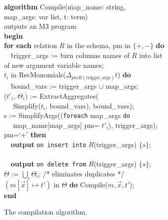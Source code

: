 \begin{figure}
\begin{tabbing}
{\bf algorithm} Compile(\=map\_name: string, \\
                  \>map\_args: var list,
                    t: term) \\
outputs an M3 program \\
{\bf begin} \\
{\bf for each} relation $R$ in the schema,
               pm in $\{+,-\}$ {\bf do} \\
~~\=
  trigger\_args := \=turn columns names of $R$ into list \\
\>               \>of new argument variable names; \\[1ex]
 $t_i$ in
        RecMonomials($\Delta_{pm R(\mathrm{trigger\_args})} t$) {\bf do} \\[1ex]
\>~~\=bound\_vars := trigger\_args $\cup$ map\_args; \\[1ex]
\>\>($t'_i$, $\Theta_i$) := ExtractAggregates( \\
\>\>~~      Simplify($t_i$, bound\_vars), bound\_vars); \\[1ex]
\>\>s := SimplifyArgs\big(({\tt foreach} map\_args {\tt do} \\
\>\>~~       map\_name[map\_args] pm= $t'_i$), trigger\_args\big); \\[1ex]
\> pm=`+' {\bf then} \\
\>\>~~{\bf output} {\tt on insert into} $R$(trigger\_args) $\{s\}$; \\
\> \\
\>\>~~{\bf output} {\tt on delete from} $R$(trigger\_args) $\{s\}$; \\[1ex]
\>$\Theta$ := $\bigcup_i \Theta_i$; /* eliminates duplicates */ \\
 $(m[\vec{x}] \mapsto t')$ in $\Theta$ {\bf do}
                 Compile($m, \vec{x}, t'$); \\
{\bf end}
\end{tabbing}

\vspace{-6mm}

\caption{The compilation algorithm.}
\label{fig:compilation-algo}
\end{figure}


